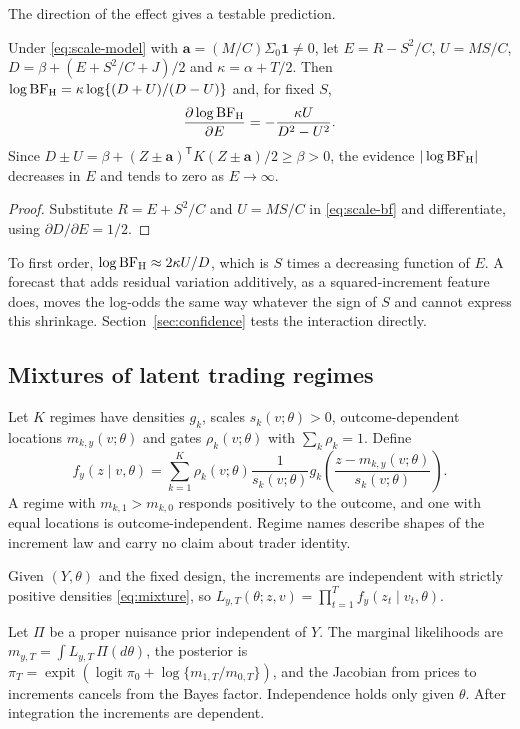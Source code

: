 \documentclass[runningheads]{llncs}
\newcommand{\logit}{\operatorname{logit}}
\newcommand{\sigmoid}{\operatorname{expit}}
\begin{document}
The direction of the effect gives a testable prediction.

\begin{corollary}
\label{cor:shrink}
Under \eqref{eq:scale-model} with $\boldsymbol a=(M/C)\Sigma_0\boldsymbol1\neq0$, let $E=R-S^2/C$, $U=MS/C$, $D=\beta+(E+S^2/C+J)/2$ and $\kappa=\alpha+T/2$. Then $\log\mathrm{BF}_{\rm H}=\kappa\log\{(D+U)/(D-U)\}$ and, for fixed $S$,
\[
 \frac{\partial\log\mathrm{BF}_{\rm H}}{\partial E}=-\frac{\kappa U}{D^2-U^2}.
\]
Since $D\pm U=\beta+(Z\pm\boldsymbol a)^{\mathsf T}K(Z\pm\boldsymbol a)/2\geq\beta>0$, the evidence $|\log\mathrm{BF}_{\rm H}|$ decreases in $E$ and tends to zero as $E\to\infty$.
\end{corollary}
\begin{proof}
Substitute $R=E+S^2/C$ and $U=MS/C$ in \eqref{eq:scale-bf} and differentiate, using $\partial D/\partial E=1/2$.
\end{proof}
To first order, $\log\mathrm{BF}_{\rm H}\approx2\kappa U/D$, which is $S$ times a decreasing function of $E$. A forecast that adds residual variation additively, as a squared-increment feature does, moves the log-odds the same way whatever the sign of $S$ and cannot express this shrinkage. Section~\ref{sec:confidence} tests the interaction directly.

\subsection{Mixtures of latent trading regimes}
\label{sec:mixture}
Let $K$ regimes have densities $g_k$, scales $s_k(v;\theta)>0$, outcome-dependent locations $m_{k,y}(v;\theta)$ and gates $\rho_k(v;\theta)$ with $\sum_k\rho_k=1$. Define
\begin{equation}
 f_y(z\mid v,\theta)=\sum_{k=1}^K\rho_k(v;\theta)\frac1{s_k(v;\theta)}g_k\!\left(\frac{z-m_{k,y}(v;\theta)}{s_k(v;\theta)}\right).
 \label{eq:mixture}
\end{equation}
A regime with $m_{k,1}>m_{k,0}$ responds positively to the outcome, and one with equal locations is outcome-independent. Regime names describe shapes of the increment law and carry no claim about trader identity.

\begin{assumption}
\label{ass:product}
Given $(Y,\theta)$ and the fixed design, the increments are independent with strictly positive densities \eqref{eq:mixture}, so $L_{y,T}(\theta;z,v)=\prod_{t=1}^Tf_y(z_t\mid v_t,\theta)$.
\end{assumption}
Let $\Pi$ be a proper nuisance prior independent of $Y$. The marginal likelihoods are $m_{y,T}=\int L_{y,T}\,\Pi(d\theta)$, the posterior is $\pi_T=\sigmoid(\logit\pi_0+\log\{m_{1,T}/m_{0,T}\})$, and the Jacobian from prices to increments cancels from the Bayes factor. Independence holds only given $\theta$. After integration the increments are dependent.
\end{document}
